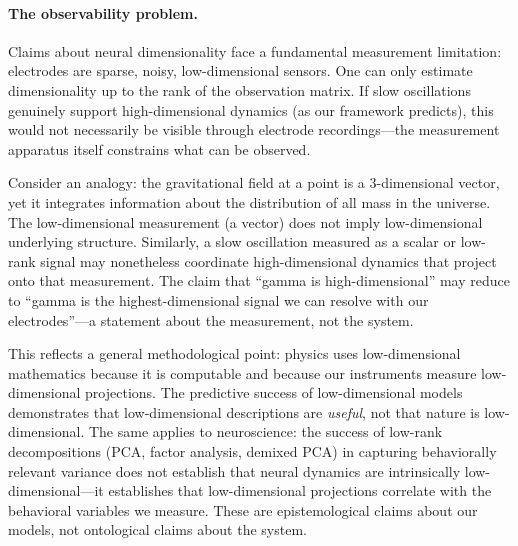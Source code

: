 \documentclass[12pt]{article}
\begin{document}
\paragraph{The observability problem.} Claims about neural dimensionality face a fundamental measurement limitation: electrodes are sparse, noisy, low-dimensional sensors. One can only estimate dimensionality up to the rank of the observation matrix. If slow oscillations genuinely support high-dimensional dynamics (as our framework predicts), this would not necessarily be visible through electrode recordings---the measurement apparatus itself constrains what can be observed.

Consider an analogy: the gravitational field at a point is a 3-dimensional vector, yet it integrates information about the distribution of all mass in the universe. The low-dimensional measurement (a vector) does not imply low-dimensional underlying structure. Similarly, a slow oscillation measured as a scalar or low-rank signal may nonetheless coordinate high-dimensional dynamics that project onto that measurement. The claim that ``gamma is high-dimensional'' may reduce to ``gamma is the highest-dimensional signal we can resolve with our electrodes''---a statement about the measurement, not the system.

This reflects a general methodological point: physics uses low-dimensional mathematics because it is computable and because our instruments measure low-dimensional projections. The predictive success of low-dimensional models demonstrates that low-dimensional descriptions are \emph{useful}, not that nature is low-dimensional. The same applies to neuroscience: the success of low-rank decompositions (PCA, factor analysis, demixed PCA) in capturing behaviorally relevant variance does not establish that neural dynamics are intrinsically low-dimensional---it establishes that low-dimensional projections correlate with the behavioral variables we measure. These are epistemological claims about our models, not ontological claims about the system.
\end{document}
